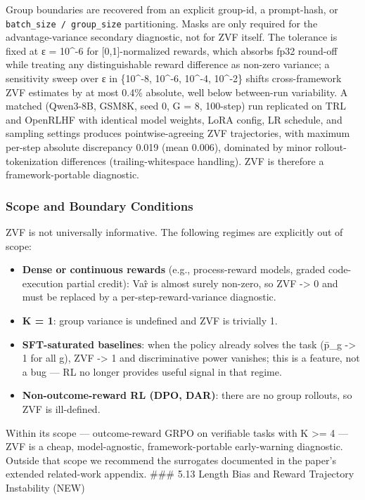 \documentclass[
  american,
  11pt,
  a4paper,
  oneside]{report}
\providecommand{\tightlist}{%
  \setlength{\itemsep}{0pt}\setlength{\parskip}{0pt}}
\begin{document}
Group boundaries are recovered from an explicit group-id, a prompt-hash,
or \texttt{batch\_size\ /\ group\_size} partitioning. Masks are only
required for the advantage-variance secondary diagnostic, not for ZVF
itself. The tolerance is fixed at ε = 10\^{}-6 for {[}0,1{]}-normalized
rewards, which absorbs fp32 round-off while treating any distinguishable
reward difference as non-zero variance; a sensitivity sweep over ε in
\{10\^{}-8, 10\^{}-6, 10\^{}-4, 10\^{}-2\} shifts cross-framework ZVF
estimates by at most 0.4\% absolute, well below between-run variability.
A matched (Qwen3-8B, GSM8K, seed 0, G = 8, 100-step) run replicated on
TRL and OpenRLHF with identical model weights, LoRA config, LR schedule,
and sampling settings produces pointwise-agreeing ZVF trajectories, with
maximum per-step absolute discrepancy 0.019 (mean 0.006), dominated by
minor rollout-tokenization differences (trailing-whitespace handling).
ZVF is therefore a framework-portable diagnostic.

\subsubsection{Scope and Boundary
Conditions}\label{scope-and-boundary-conditions}

ZVF is not universally informative. The following regimes are explicitly
out of scope:

\begin{itemize}
\tightlist
\item
  \textbf{Dense or continuous rewards} (e.g., process-reward models,
  graded code-execution partial credit): Var̂ is almost surely non-zero,
  so ZVF -\textgreater{} 0 and must be replaced by a
  per-step-reward-variance diagnostic.
\item
  \textbf{K = 1}: group variance is undefined and ZVF is trivially 1.
\item
  \textbf{SFT-saturated baselines}: when the policy already solves the
  task (p̄\_g -\textgreater{} 1 for all g), ZVF -\textgreater{} 1 and
  discriminative power vanishes; this is a feature, not a bug --- RL no
  longer provides useful signal in that regime.
\item
  \textbf{Non-outcome-reward RL (DPO, DAR)}: there are no group
  rollouts, so ZVF is ill-defined.
\end{itemize}

Within its scope --- outcome-reward GRPO on verifiable tasks with K
\textgreater= 4 --- ZVF is a cheap, model-agnostic, framework-portable
early-warning diagnostic. Outside that scope we recommend the surrogates
documented in the paper's extended related-work appendix. \#\#\# 5.13
Length Bias and Reward Trajectory Instability (NEW)
\end{document}
